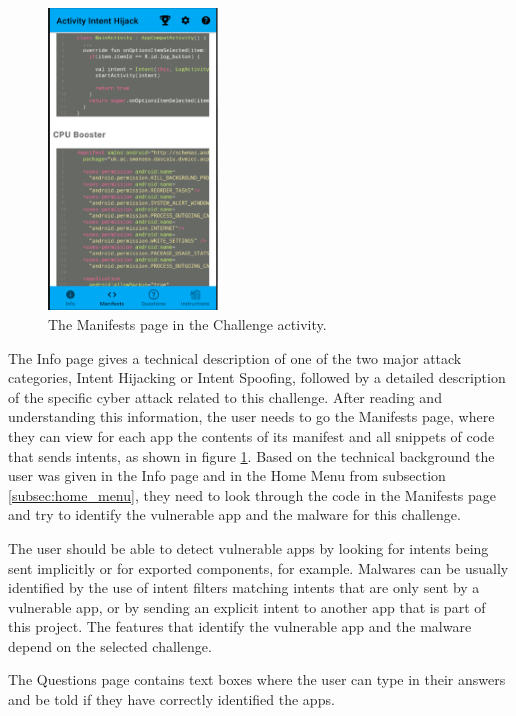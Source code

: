     \begin{figure}
        \centering
        \includegraphics[width=0.4\textwidth]{graphics/manifests.PNG}
        \caption{The Manifests page in the Challenge activity.}
        \label{fig:manifests_fragment}
    \end{figure}
    
    The Info page gives a technical description of one of the two major attack categories, Intent Hijacking or Intent Spoofing, followed by a detailed description of the specific cyber attack related to this challenge. After reading and understanding this information, the user needs to go the Manifests page, where they can view for each app the contents of its manifest and all snippets of code that sends intents, as shown in figure \ref{fig:manifests_fragment}. Based on the technical background the user was given in the Info page and in the Home Menu from subsection \ref{subsec:home_menu}, they need to look through the code in the Manifests page and try to identify the vulnerable app and the malware for this challenge. 
    
    The user should be able to detect vulnerable apps by looking for intents being sent implicitly or for exported components, for example. Malwares can be usually identified by the use of intent filters matching intents that are only sent by a vulnerable app, or by sending an explicit intent to another app that is part of this project. The features that identify the vulnerable app and the malware depend on the selected challenge.
    
    The Questions page contains text boxes where the user can type in their answers and be told if they have correctly identified the apps.
    
